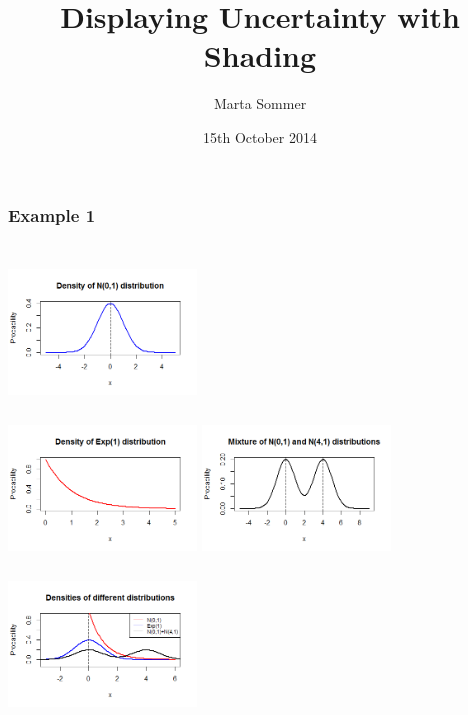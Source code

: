 \documentclass[11pt,usenames,dvipsnames,svgnames,x11names]{beamer}
\date{15th October 2014}
\author{Marta Sommer}
\title{Displaying Uncertainty with Shading}
\theoremstyle{plain}
\theoremstyle{definition}
\theoremstyle{remark}
\begin{document}
\begin{frame}   %
\titlepage
\end{frame}


\begin{frame}
	\frametitle{Example 1}
	\begin{columns}[t]
			\centering
			\includegraphics[width=5cm,height=4cm]{1.png}\\
			\includegraphics[width=5cm,height=4cm]{2.png}
		\centering
		\includegraphics[width=5cm,height=4cm]{3.png}\\
		\includegraphics[width=5cm,height=4cm]{4.png}
	\end{columns}
\end{frame}
\end{document}
